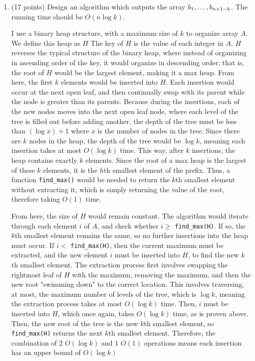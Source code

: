 \documentclass[11pt]{article}
\begin{document}
\begin{enumerate}
\item (17 points) Design an algorithm which outputs the array $b_1,\mathellipsis,b_{n+1-k}$. The running time should be $O(n\log k)$.

I use a binary heap structure, with a maximum size of $k$ to organize array $A$. We define this heap as $H$ The key of $H$ is the value of each integer in $A$. 
$H$ reverses the typical structure of the binary heap, where instead of organizing in ascending order of the key, it would organize in descending order; 
that is, the root of $H$ would be the largest element, making it a max heap. From here, the first $k$ elements would be inserted into $H$. 
Each insertion would occur at the next open leaf, and then continually swap with its parent while the node is greater than its parents. 
Because during the insertions, each of the new nodes moves into the next open leaf node, where each level of the tree is filled out before adding another, 
the depth of the tree must be less than $(\log x) + 1$ where $x$ is the number of nodes in the tree. Since there are $k$ nodes in the heap, 
the depth of the tree would be $\log k$, meaning each insertion takes at most $O(\log k)$ time. 
This way, after $k$ insertions, the heap contains exactly $k$ elements. Since the root of a max heap is the largest of these $k$ elements, 
it is the $h$th smallest element of the prefix. Thus, a function \verb|find_max()| would be needed to return the $k$th smallest element without extracting it, 
which is simply returning the value of the root, therefore taking $O(1)$ time.

From here, the size of $H$ would remain constant. The algorithm would iterate through each element $i$ of $A$, and check whether $i \geq$ \verb|find_max(H)|. 
If so, the $k$th smallest element remains the same, so no further insertions into the heap must occur. If $i <$ \verb|find_max(H)|, 
then the current maximum must be extracted, and the new element $i$ must be inserted into $H$, to find the new $k$th smallest element. 
The extraction process first involves swapping the rightmost leaf of $H$ with the maximum, removing the maximum, 
and then the new root "swimming down" to the correct location. This involves traversing, at most, the maximum number of levels of the tree, which is $\log k$, 
meaning the extraction process takes at most $O(\log k)$ time. Then, $i$ must be inserted into $H$, which once again, takes $O(\log k)$ time, 
as is proven above. Then, the new root of the tree is the new $k$th smallest element, so \verb|find_max(H)| returns the next $k$th smallest element. 
Therefore, the combination of $2$ $O(\log k)$ and $1$ $O(1)$ operations means each insertion has an upper bound of $O(\log k)$


\end{enumerate}
\end{document}
